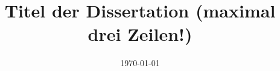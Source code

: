 \documentclass[
  type=PhD, %
  lang=german, %
  study=Doktorat, %
  uni=LFUI, %
  expose=true, %
  explanation=true, %
]{ftwthesis}
\title{Titel der Dissertation (maximal drei Zeilen!)}
\date{\today}
\begin{document}
\tableofcontents\clearpage





\FTWBlindDocument



\end{document}
